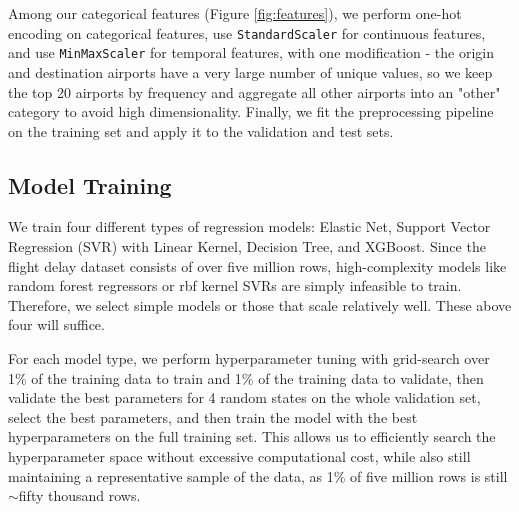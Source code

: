 \documentclass{chaistyle}
\begin{document}
Among our categorical features (Figure \ref{fig:features}), we perform one-hot encoding on categorical features, use \texttt{StandardScaler} for continuous features, and use \texttt{MinMaxScaler} for temporal features, with one modification - the origin and destination airports have a very large number of unique values, so we keep the top 20 airports by frequency and aggregate all other airports into an "other" category to avoid high dimensionality. Finally, we fit the preprocessing pipeline on the training set and apply it to the validation and test sets.
\subsection{Model Training}
We train four different types of regression models: Elastic Net, Support Vector Regression (SVR) with Linear Kernel, Decision Tree, and XGBoost. Since the flight delay dataset consists of over five million rows, high-complexity models like random forest regressors or rbf kernel SVRs are simply infeasible to train. Therefore, we select simple models or those that scale relatively well. These above four will suffice.

For each model type, we perform hyperparameter tuning with grid-search over 1\% of the training data to train and 1\% of the training data to validate, then validate the best parameters for 4 random states on the whole validation set, select the best parameters, and then train the model with the best hyperparameters on the full training set. This allows us to efficiently search the hyperparameter space without excessive computational cost, while also still maintaining a representative sample of the data, as 1\% of five million rows is still \(\sim\)fifty thousand rows.
\end{document}

